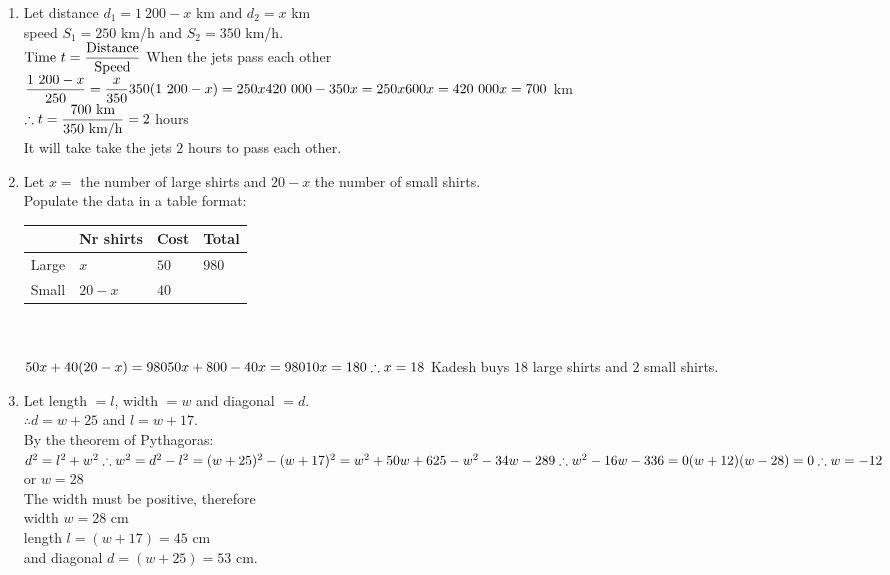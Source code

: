  \begin{solutions}{}{
\begin{enumerate}[itemsep=10pt, label=\textbf{\arabic*}. ] 


\item Let distance $d_1=1~200-x$ km and $d_2=x$ km \\
speed $S_1=250$ km/h and $S_2=350$ km/h. \\
$\mbox{Time } t = \dfrac{\mbox{Distance}}{\mbox{Speed}} \\[5pt]$
When the jets pass each other $\dfrac{1~200-x}{250} = \dfrac{x}{350}\\[5pt]
350(1~200-x)=250x\\
420~000 - 350x = 250x\\
600x = 420~000\\
x= 700$ km\\[5pt]

$\therefore t=\dfrac{700\mbox{ km}}{350{\mbox{ km/h}}}\\[5pt]
=2$ hours\\
It will take take the jets $2$ hours to pass each other.

\item  Let $x=$ the number of large shirts and $20-x$ the number of small shirts.\\
Populate the data in a table format:\\
  \begin{tabularx}{8cm}{ |X|X|X|X| }\hline
& Nr shirts & Cost & Total \\ \hline
Large & $x$ & $50$ & $980$\\ \hline
Small & $20-x$ & $40$&\\ \hline
\end{tabularx}\\
\\
$50x+40(20-x)=980\\
50x+800-40x=980\\
10x=180\\
\therefore x=18\\$
Kadesh buys $18$ large shirts and $2$ small shirts.

\item Let length $=l$, width $=w$ and diagonal $=d$.\\
$\therefore d=w+25$ and $l=w+17$.\\
By the theorem of Pythagoras:\\
$d^2 = l^2+w^2\\
\therefore w^2 = d^2-l^2\\
=(w+25)^2 - (w+17)^2\\
=w^2+50w+625-w^2-34w-289\\
\therefore w^2 - 16w - 336 = 0\\
(w+12)(w-28)=0\\
\therefore w= -12$ or $w=28$\\
The width must be positive, therefore \\
width $w=28$ cm\\ 
length $l=(w+17)=45$ cm \\
and diagonal $d=(w+25)=53$ cm.



\end{enumerate}}
\end{solutions}
